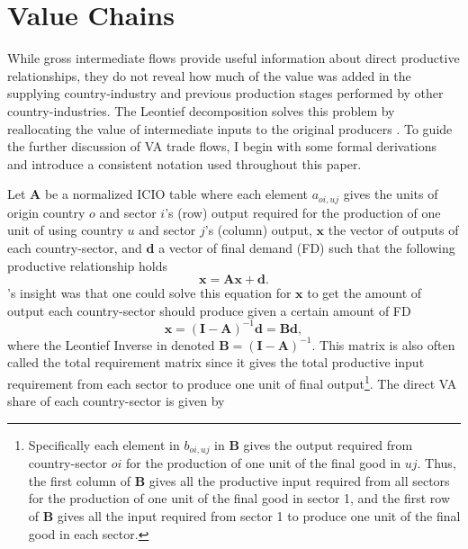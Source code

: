 \documentclass[a4paper]{article}
\begin{document}
\section{Value Chains}

While gross intermediate flows provide useful information about direct productive relationships, they do not reveal how much of the value was added in the supplying country-industry and previous production stages performed by other country-industries. The Leontief decomposition solves this problem by reallocating the value of intermediate inputs to the original producers \citep{Kummritz2014}. To guide the further discussion of VA trade flows, I begin with some formal derivations and introduce a consistent notation used throughout this paper. \newline

Let $\textbf{A}$ be a normalized ICIO table where each element $a_{oi,uj}$ gives the units of origin country $o$ and sector $i$'s (row) output required for the production of one unit of using country $u$ and sector $j$'s (column) output, $\textbf{x}$ the vector of outputs of each country-sector, and $\textbf{d}$ a vector of final demand (FD) such that the following productive relationship holds
%
\begin{equation} \label{eq:io_model}
\textbf{x} = \textbf{A}\textbf{x} + \textbf{d}.
\end{equation}
%
\citet{leontief1936quantitative}'s insight was that one could solve this equation for $\textbf{x}$ to get the amount of output each country-sector should produce given a certain amount of FD
%
\begin{equation} \label{eq:leontief}
\textbf{x} = (\textbf{I}-\textbf{A})^{-1} \textbf{d} = \textbf{B}\textbf{d},
\end{equation}
%
\noindent where the Leontief Inverse in denoted $\textbf{B} = (\textbf{I}-\textbf{A})^{-1}$. This matrix is also often called the total requirement matrix since it gives the total productive input requirement from each sector to produce one unit of final output\footnote{Specifically each element in $b_{oi,uj}$ in \textbf{B} gives the output required from country-sector $oi$ for the production of one unit of the final good in $uj$. Thus, the first column of \textbf{B} gives all the productive input required from all sectors for the production of one unit of the final good in sector 1, and the first row of \textbf{B} gives all the input required from sector 1 to produce one unit of the final good in each sector. \vspace{-5mm}}. The direct VA share of each country-sector is given by
\end{document}
